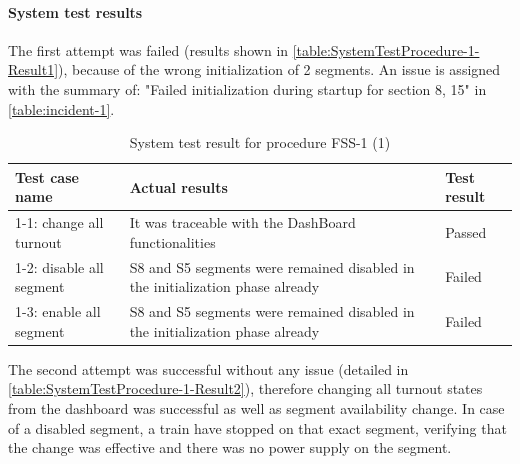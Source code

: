 \paragraph{System test results} The first attempt was failed (results shown in \autoref{table:SystemTestProcedure-1-Result1}), because of the wrong initialization of 2 segments. An issue is assigned with the summary of: "Failed initialization during startup for section 8, 15" in \autoref{table:incident-1}.
\begin{table}[ht]
	\caption{System test result for procedure FSS-1 (1)}
	\label{table:SystemTestProcedure-1-Result1}
	\begin{center}
		\renewcommand{\arraystretch}{1.8}
		\begin{tabu} 
			to 0.9 \textwidth
			{  X[1.5, c] X[2.5, c] X[c]  }
			\toprule
			Test case name           & Actual results                                                                & Test result \\ -1: change all turnout  & It was traceable with the DashBoard functionalities                           & Passed      \\
			1-2: disable all segment & S8 and S5 segments were remained disabled in the initialization phase already & Failed      \\
			1-3: enable all segment  & S8 and S5 segments were remained disabled in the initialization phase already & Failed      \\ \bottomrule
		\end{tabu}
	\end{center}
\end{table}

The second attempt was successful without any issue (detailed in \autoref{table:SystemTestProcedure-1-Result2}), therefore changing all turnout states from the dashboard was successful as well as segment availability change. In case of a disabled segment, a train have stopped on that exact segment, verifying that the change was effective and there was no power supply on the segment.
 
